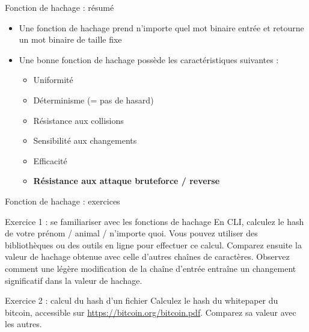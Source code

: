 \begin{frame}{Fonction de hachage : résumé}
  \begin{itemize}
    \item Une fonction de hachage prend n'importe quel mot binaire entrée et retourne un mot binaire de taille fixe
    \item Une bonne fonction de hachage possède les caractéristiques suivantes :
          \begin{itemize}
            \item Uniformité
            \item Déterminisme (= pas de hasard)
            \item Résistance aux collisions
            \item Sensibilité aux changements
            \item Efficacité
            \item \textbf{Résistance aux attaque bruteforce / reverse}
          \end{itemize}
  \end{itemize}
\end{frame}

\begin{frame}{Fonction de hachage : exercices}
  \begin{block}{Exercice 1 : se familiariser avec les fonctions de hachage}
    En CLI, calculez le hash de votre prénom / animal / n'importe quoi.
    Vous pouvez utiliser des bibliothèques ou des outils en ligne pour effectuer ce calcul.
    Comparez ensuite la valeur de hachage obtenue avec celle d'autres chaînes de caractères.
    Observez comment une légère modification de la chaîne d'entrée entraîne un changement significatif dans la valeur de hachage.
  \end{block}

  \begin{block}{Exercice 2 : calcul du hash d'un fichier}
    Calculez le hash du whitepaper du bitcoin, accessible sur \url{https://bitcoin.org/bitcoin.pdf}.
    Comparez sa valeur avec les autres.
  \end{block}
\end{frame}